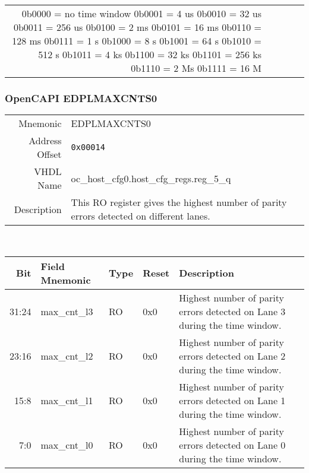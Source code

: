 \begin{tabularx}{\textwidth}{r|l|l|l|X}
  \setlength\parindent{24pt}
  \indent 0b0000 = no time window  \newline
  \indent 0b0001 = 4 us  \newline
  \indent 0b0010 = 32 us  \newline
  \indent 0b0011 = 256 us  \newline
  \indent 0b0100 = 2 ms \newline
  \indent 0b0101 = 16 ms \newline
  \indent 0b0110 = 128 ms \newline
  \indent 0b0111 = 1 s \newline
  \indent 0b1000 = 8 s \newline
  \indent 0b1001 = 64 s \newline
  \indent 0b1010 = 512 s \newline
  \indent 0b1011 = 4 ks \newline
  \indent 0b1100 = 32 ks \newline
  \indent 0b1101 = 256 ks \newline
  \indent 0b1110 = 2 Ms \newline
  \indent 0b1111 = 16 M

\end{tabularx}


\subsubsection{OpenCAPI EDPLMAXCNTS0}
\begin{tabular}{ r | p{350px} }
  Mnemonic       & EDPLMAXCNTS0            \\
  Address Offset & \texttt{0x00014}                         \\
  VHDL Name      & oc\_host\_cfg0.host\_cfg\_regs.reg\_5\_q \\ \hline

  Description &
  This RO register gives the highest number of parity errors detected on different lanes. \\

\end{tabular}
\\
\begin{tabularx}{\textwidth}{r|l|l|l|X}
  \hline
  Bit   & Field Mnemonic    & Type & Reset      & Description \\ \hline

  31:24 & max\_cnt\_l3  &  RO   & 0x0 & Highest number of parity errors detected on Lane 3 during the time window.\\
  23:16 & max\_cnt\_l2  &  RO   & 0x0 & Highest number of parity errors detected on Lane 2 during the time window.\\
  15:8  & max\_cnt\_l1  &  RO   & 0x0 & Highest number of parity errors detected on Lane 1 during the time window.\\
  7:0   & max\_cnt\_l0  &  RO   & 0x0 & Highest number of parity errors detected on Lane 0 during the time window.\\
\end{tabularx}

